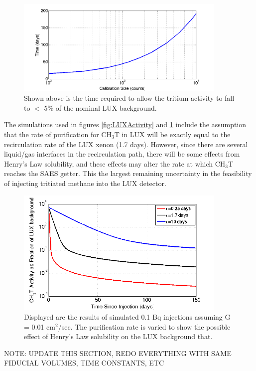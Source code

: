 \begin{figure}[h!]
\centering
\includegraphics[width=0.9\textwidth]{Calibration_length.png}
\caption{Shown above is the time required to allow the tritium activity to fall to $<$ 5\% of the nominal LUX background. }
\label{fig:cal_time}
\end{figure}

The simulations used in figures \ref{fig:LUXActivity} and \ref{fig:cal_time} include the assumption that the rate of purification for CH$_3$T in LUX will be exactly equal to the recirculation rate of the LUX xenon (1.7 days). However, since there are several liquid/gas interfaces in the recirculation path, there will be some effects from Henry's Law solubility, and these effects may alter the rate at which CH$_3$T reaches the SAES getter. This the largest remaining uncertainty in the feasibility of injecting tritiated methane into the LUX detector.

\begin{figure}[H]
\centering
\includegraphics[width=0.9\textwidth]{tau_var_CH3T.png}
\caption{Displayed are the results of simulated 0.1 Bq injections assuming G = 0.01 cm$^2$/sec. The purification rate is varied to show the possible effect of Henry's Law solubility on the LUX background that.}
\label{fig:tau_var}
\end{figure}

NOTE: UPDATE THIS SECTION, REDO EVERYTHING WITH SAME FIDUCIAL VOLUMES, TIME CONSTANTS, ETC
